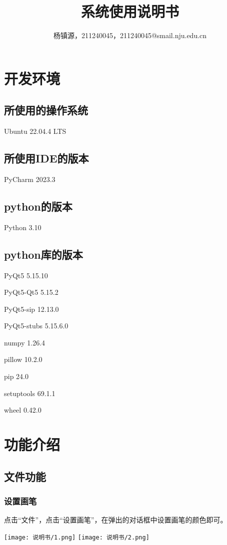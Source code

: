 \documentclass[a4paper,UTF8]{article}
\title{\textbf{系统使用说明书}}
\author{杨镇源，211240045，211240045@smail.nju.edu.cn}
\theoremstyle{definition}
\begin{document}
	\maketitle
	\tableofcontents 
	\newpage
	
	\section{开发环境}
	
		\subsection{所使用的操作系统}
		Ubuntu 22.04.4 LTS
	
		\subsection{所使用IDE的版本}
		PyCharm 2023.3
	
		\subsection{python的版本}
		Python 3.10
	
		\subsection{python库的版本}
		PyQt5 5.15.10
	
		PyQt5-Qt5 5.15.2
	
		PyQt5-sip 12.13.0
	
		PyQt5-stubs 5.15.6.0
	
		numpy 1.26.4
	
		pillow 10.2.0
	
		pip 24.0
	
		setuptools 69.1.1
	
		wheel 0.42.0
	
	\section{功能介绍}
		\subsection{文件功能}
		\subsubsection{设置画笔}
		点击“文件”，点击“设置画笔”，在弹出的对话框中设置画笔的颜色即可。
		\begin{center}
			\texttt{[image: 说明书/1.png]}
			\texttt{[image: 说明书/2.png]}
		\end{center}
	
\end{document}

